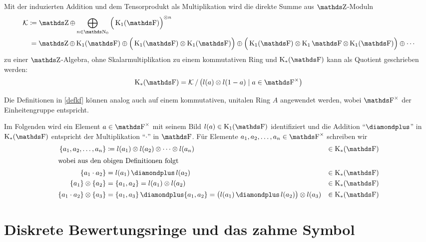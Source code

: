 \documentclass[ngerman,fontsize=11pt, paper=a4, parskip=half, titlepage=true, toc=bib]{scrartcl}
\begin{document}
\begin{Bem}
  Mit der induzierten Addition und dem Tensorprodukt als
  Multiplikation wird die direkte Summe aus $\Z$-Moduln
  \begin{align*}
    \calK &\coloneqq
    \Z\oplus\bigoplus_{n\in\N_0}{\Big(\K_1(\F)\Big)}^{\otimes n}\\
    &\,= \Z\oplus\K_1(\F)
      \oplus\Big(\K_1(\F)\otimes\K_1(\F)\Big)
    \oplus\Big(\K_1(\F)\otimes\K_1\F\otimes\K_1(\F)\Big)
    \oplus\dotsb
  \end{align*}
  zu einer $\Z$-Algebra, 
  ohne Skalarmultiplikation zu einem kommutativen Ring und
  $\KF$ kann als Quotient geschrieben werden:
  \begin{gather*}
    \KF = \calK / \left(l(a)\otimes l(1-a)\mid a\in\Fx\right)
  \end{gather*}
\end{Bem}

\begin{Bem}
  Die Definitionen in \ref{defkf} können analog auch auf 
  einem kommutativen, unitalen Ring $A$ angewendet werden,
  wobei $\Fx$ der Einheitengruppe entspricht.
\end{Bem}

\begin{Not}
  Im Folgenden wird ein Element $a\in\Fx$ mit seinem Bild
  $l(a)\in\K_1(\F)$ identifiziert 
  und die Addition \enquote{$\p$} in $\KF$
  entspricht der Multiplikation \enquote{$\cdot$} in $\F$.
  Für Elemente $a_1,a_2,\dotsc,a_n\in\Fx$ schreiben wir
  \begin{align*}
    \{ a_1,a_2,\dotsc,a_n\}
    &\coloneqq l(a_1)\otimes l(a_2)\otimes \dotsb \otimes l(a_n) &\in\KF \\
    \intertext{wobei aus den obigen Definitionen folgt}
    \{ a_1 \cdot a_2 \}
    &=  l(a_1)\p l(a_2)  &\in\KF \\
    \{ a_1 \} \otimes \{ a_2 \}
    &= \{ a_1,a_2 \} = l(a_1)\otimes l(a_2) &\in\KF \\
    \{ a_1\cdot a_2 \} \otimes \{ a_3 \}
    &= \{ a_1,a_3 \} \p \{a_1, a_2\} 
      =  \big(l(a_1)\p l(a_2)\big) \otimes l(a_3) &\in\KF
  \end{align*}
\end{Not}

\section{Diskrete Bewertungsringe und das zahme Symbol}
\cite[][Lemma 2.1]{milnor}
\end{document}

